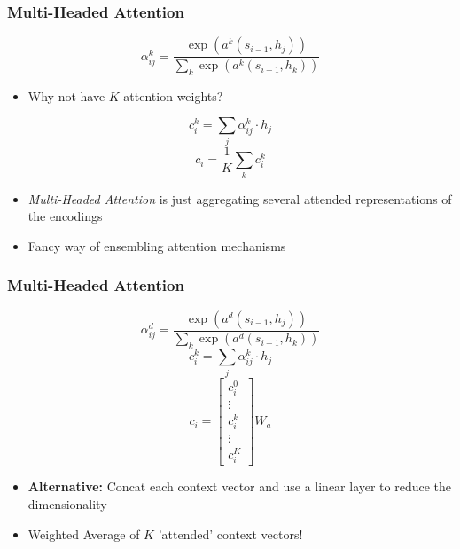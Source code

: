 \documentclass[usenames,dvipsnames]{beamer}
\begin{document}
\begin{frame}
\frametitle{Multi-Headed Attention}
\begin{equation*}
  \alpha_{ij}^k = \frac{\exp\left(a^k\left(s_{i-1}, h_j\right)\right)}{\sum_k \exp \left( a^k \left(s_{i-1}, h_k\right) \right)}
\end{equation*}
\begin{itemize}
  \item Why not have $K$ attention weights?
\end{itemize}
\begin{equation*}
  c_i^{k} = \sum_j \alpha_{ij}^k \cdot h_j
\end{equation*}
\begin{equation*}
  c_i =\frac{1}{K} \sum_k c_i^k
\end{equation*}
\begin{itemize}
  \item \textit{Multi-Headed Attention} is just aggregating several attended representations of the encodings
  \item Fancy way of ensembling attention mechanisms
\end{itemize}
\end{frame}

\begin{frame}
  \frametitle{Multi-Headed Attention}
  \begin{equation*}
    \alpha_{ij}^d = \frac{\exp\left(a^d\left(s_{i-1}, h_j\right)\right)}{\sum_k \exp \left( a^d \left(s_{i-1}, h_k\right) \right)}
  \end{equation*}
  \begin{equation*}
    c_i^{k} = \sum_j \alpha_{ij}^k \cdot h_j
  \end{equation*}
  \begin{equation*}
    c_i = \begin{bmatrix*} c^0_{i} \\ \vdots \\ c^k_{i} \\ \vdots \\ c^K_{i} \end{bmatrix*} W_a
  \end{equation*}
  \begin{itemize}
    \item \textbf{Alternative:} Concat each context vector and use a linear layer to reduce the dimensionality
    \item Weighted Average of $K$ 'attended' context vectors!
  \end{itemize}
\end{frame}
\end{document}
